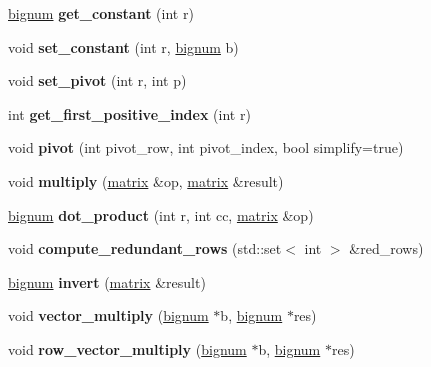 \begin{DoxyCompactItemize}
\item 
\hypertarget{classmatrix_a86510224f830f6c92ca415df037727aa}{\hyperlink{classbignum}{bignum} {\bfseries get\-\_\-constant} (int r)}\label{classmatrix_a86510224f830f6c92ca415df037727aa}

\item 
\hypertarget{classmatrix_a806dfaa0efa6f3b3b89aaad05265782a}{void {\bfseries set\-\_\-constant} (int r, \hyperlink{classbignum}{bignum} b)}\label{classmatrix_a806dfaa0efa6f3b3b89aaad05265782a}

\item 
\hypertarget{classmatrix_accea607c2f03c6b146dbbe9e7485f442}{void {\bfseries set\-\_\-pivot} (int r, int p)}\label{classmatrix_accea607c2f03c6b146dbbe9e7485f442}

\item 
\hypertarget{classmatrix_a60f033001cb12ece250d24e7d4a2877d}{int {\bfseries get\-\_\-first\-\_\-positive\-\_\-index} (int r)}\label{classmatrix_a60f033001cb12ece250d24e7d4a2877d}

\item 
\hypertarget{classmatrix_ad37aac40673b23a7a51e1442ce324cf8}{void {\bfseries pivot} (int pivot\-\_\-row, int pivot\-\_\-index, bool simplify=true)}\label{classmatrix_ad37aac40673b23a7a51e1442ce324cf8}

\item 
\hypertarget{classmatrix_aab888ed9660b734a8e14ae8db9ebf320}{void {\bfseries multiply} (\hyperlink{classmatrix}{matrix} \&op, \hyperlink{classmatrix}{matrix} \&result)}\label{classmatrix_aab888ed9660b734a8e14ae8db9ebf320}

\item 
\hypertarget{classmatrix_a1b0be29630a770624c7ee93641547d55}{\hyperlink{classbignum}{bignum} {\bfseries dot\-\_\-product} (int r, int cc, \hyperlink{classmatrix}{matrix} \&op)}\label{classmatrix_a1b0be29630a770624c7ee93641547d55}

\item 
\hypertarget{classmatrix_a098decbf12b8c5b66575d17fce4c7f1f}{void {\bfseries compute\-\_\-redundant\-\_\-rows} (std\-::set$<$ int $>$ \&red\-\_\-rows)}\label{classmatrix_a098decbf12b8c5b66575d17fce4c7f1f}

\item 
\hypertarget{classmatrix_a5323b59c82073276e1facbd22abcf8f1}{\hyperlink{classbignum}{bignum} {\bfseries invert} (\hyperlink{classmatrix}{matrix} \&result)}\label{classmatrix_a5323b59c82073276e1facbd22abcf8f1}

\item 
\hypertarget{classmatrix_a3a708f73636f1302b91c99183381b443}{void {\bfseries vector\-\_\-multiply} (\hyperlink{classbignum}{bignum} $\ast$b, \hyperlink{classbignum}{bignum} $\ast$res)}\label{classmatrix_a3a708f73636f1302b91c99183381b443}

\item 
\hypertarget{classmatrix_ac304b39759d0551990b3da0f00309cfa}{void {\bfseries row\-\_\-vector\-\_\-multiply} (\hyperlink{classbignum}{bignum} $\ast$b, \hyperlink{classbignum}{bignum} $\ast$res)}\label{classmatrix_ac304b39759d0551990b3da0f00309cfa}

\end{DoxyCompactItemize}
